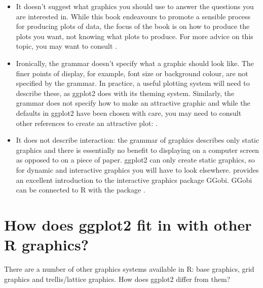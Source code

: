 \begin{itemize}
  \item It doesn't suggest what graphics you should use to answer the questions you are interested in.  While this book endeavours to promote a sensible process for producing plots of data, the focus of the book is on how to produce the plots you want, not knowing what plots to produce. For more advice on this topic, you may want to consult  \citet{robbins:2004,cleveland:1993,chambers:1983,tukey:1977}.

  \item Ironically, the grammar doesn't specify what a graphic should look like.  The finer points of display, for example, font size or background colour, are not specified by the grammar.  In practice, a useful plotting system will need to describe these, as ggplot2 does with its theming system. Similarly, the grammar does not specify how to make an attractive graphic and while the defaults in ggplot2 have been chosen with care, you may need to consult other references to create an attractive plot: \citet{tufte:1990,tufte:1997,tufte:2001,tufte:2006}.

  \item It does not describe interaction: the grammar of graphics describes only static graphics and there is essentially no benefit to displaying on a computer screen as opposed to on a piece of paper.  ggplot2 can only create static graphics, so for dynamic and interactive graphics you will have to look elsewhere.  \citet{cook:2007} provides an excellent introduction to the interactive graphics package GGobi.  GGobi can be connected to R with the  package \citep{wickham:2008b}. 

\end{itemize}

\section{How does ggplot2 fit in with other R graphics?}

There are a number of other graphics systems available in R: base graphics, grid graphics and trellis/lattice graphics.  How does ggplot2 differ from them?

